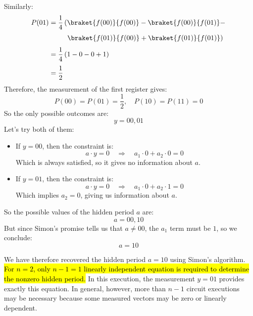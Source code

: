 \begin{enumerate}[label={\textbf{Step \arabic*.}}, leftmargin=2cm]
        Similarly:
        \begin{align*}
            P(01) &= \frac{1}{4} \left(
                \braket{f(00)}{f(00)} - \braket{f(00)}{f(01)} - \right. \\[.3em]
                &\quad\;\;\;\;\; \left.
                \braket{f(01)}{f(00)} + \braket{f(01)}{f(01)}
            \right) \\[.3em]
            &= \frac{1}{4} \left(
                1 - 0 - 0 + 1
            \right) \\[.3em]
            &= \frac{1}{2}
        \end{align*}
        Therefore, the measurement of the first register gives:
        \begin{equation*}
            P(00) = P(01) = \frac{1}{2}, \quad P(10) = P(11) = 0
        \end{equation*}
        So the only possible outcomes are:
        \begin{equation*}
            y = 00, 01
        \end{equation*}
        Let's try both of them:
        \begin{itemize}
            \item If $y = 00$, then the constraint is:
                \begin{equation*}
                    a \cdot y = 0 \quad \Rightarrow \quad a_1 \cdot 0 + a_2 \cdot 0 = 0
                \end{equation*}
                Which is always satisfied, so it gives no information about $a$.
            \item If $y = 01$, then the constraint is:
                \begin{equation*}
                    a \cdot y = 0 \quad \Rightarrow \quad a_1 \cdot 0 + a_2 \cdot 1 = 0
                \end{equation*}
                Which implies $a_2 = 0$, giving us information about $a$.
        \end{itemize}
        So the possible values of the hidden period $a$ are:
        \begin{equation*}
            a = 00, 10
        \end{equation*}
        But since Simon's promise tells us that $a \neq 00$, the $a_1$ term must be $1$, so we conclude:
        \begin{equation*}
            a = 10
        \end{equation*}
\end{enumerate}
We have therefore recovered the hidden period $a=10$ using Simon's algorithm. \hl{For $n=2$, only $n-1=1$ linearly independent equation is required to determine the nonzero hidden period.} In this execution, the measurement $y=01$ provides exactly this equation. In general, however, more than $n-1$ circuit executions may be necessary because some measured vectors may be zero or linearly dependent.

